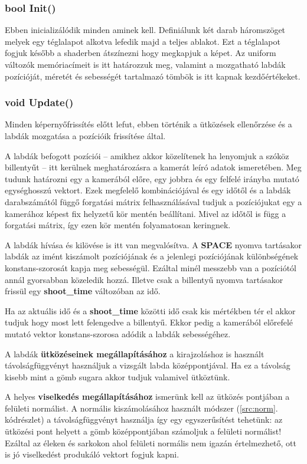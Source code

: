 \subsubsection{bool Init()}

Ebben inicializálódik minden aminek kell. Definiálunk két darab háromszöget melyek egy téglalapot alkotva lefedik majd a teljes ablakot. Ezt a téglalapot fogjuk később a shaderben átszínezni hogy megkapjuk a képet. Az uniform változók memóriacímeit is itt határozzuk meg, valamint a mozgatható labdák pozícióját, méretét és sebességét tartalmazó tömbök is itt kapnak kezdőértékeket.

\subsubsection{void Update()}

Minden képernyőfrissítés előtt lefut, ebben történik a ütközések ellenőrzése és a labdák mozgatása a pozícióik frissítése által. 

A labdák befogott pozíciói -- amikhez akkor közelítenek ha lenyomjuk a szóköz billentyűt -- itt kerülnek meghatározásra a kamerát leíró adatok ismeretében. Meg tudunk határozni egy a kamerából előre, egy jobbra és egy felfelé irányba mutató egységhosszú vektort. Ezek megfelelő kombinációjával és egy időtől és a labdák darabszámától függő forgatási mátrix felhasználásával tudjuk a pozíciójukat egy a kamerához képest fix helyzetű kör mentén beállítani. Mivel az időtől is függ a forgatási mátrix, így ezen kör mentén folyamatosan keringnek.

A labdák hívása és kilövése is itt van megvalósítva. A \textbf{SPACE} nyomva tartásakor labdák az imént kiszámolt pozíciójának és a jelenlegi pozíciójának különbségének konstans-szorosát kapja meg sebességül. Ezáltal minél messzebb van a pozíciótól annál gyorsabban közeledik hozzá. Illetve csak a billentyű nyomva tartásakor frissül egy \textbf{shoot\_time} változóban az idő. 

Ha az aktuális idő és a \textbf{shoot\_time} közötti idő csak kis mértékben tér el akkor tudjuk hogy most lett felengedve a billentyű. Ekkor pedig a kamerából előrefelé mutató vektor konstans-szorosa adódik a labdák sebességéhez.

A labdák \textbf{ütközéseinek megállapításához} a kirajzoláshoz is használt távolságfüggvényt használjuk a vizsgált labda középpontjával. Ha ez a távolság kisebb mint a gömb sugara akkor tudjuk valamivel ütköztünk.

A helyes \textbf{viselkedés megállapításához} ismerünk kell az ütközés pontjában a felületi normálist. A normális kiszámolásához használt módszer (\ref{src:norm}. kódrészlet) a távolságfüggvényt használja így egy egyszerűsítést tehetünk: az ütközési pont helyett a gömb középpontjában számoljuk a felületi normálist! Ezáltal az éleken és sarkokon ahol felületi normális nem igazán értelmezhető, ott is jó viselkedést produkáló vektort fogjuk kapni.

